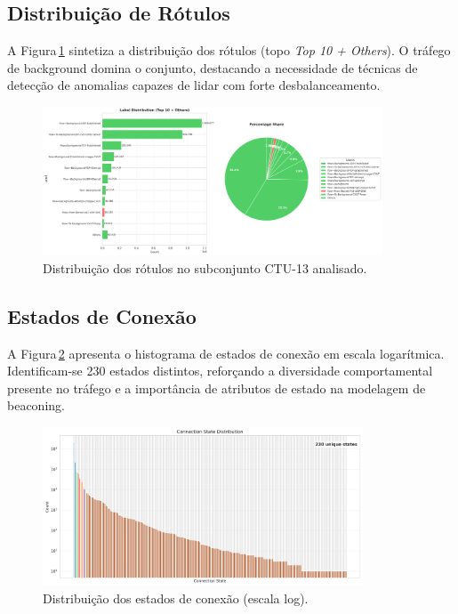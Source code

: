 \documentclass[a4paper, 12pt]{article}
\begin{document}
\subsection{Distribuição de Rótulos}
A Figura\,\ref{fig:label_distribution} sintetiza a distribuição dos rótulos (topo \emph{Top 10 + Others}). O tráfego de background domina o conjunto, destacando a necessidade de técnicas de detecção de anomalias capazes de lidar com forte desbalanceamento.

\begin{figure}[H]
    \centering
    \includegraphics[width=0.9\textwidth]{label_distribution.png}
    \caption{Distribuição dos rótulos no subconjunto CTU-13 analisado.}
    \label{fig:label_distribution}
\end{figure}

\subsection{Estados de Conexão}
A Figura\,\ref{fig:connection_state} apresenta o histograma de estados de conexão em escala logarítmica. Identificam-se 230 estados distintos, reforçando a diversidade comportamental presente no tráfego e a importância de atributos de estado na modelagem de beaconing.

\begin{figure}[H]
    \centering
    \includegraphics[width=0.85\textwidth]{connection_state_distribution.png}
    \caption{Distribuição dos estados de conexão (escala log).}
    \label{fig:connection_state}
\end{figure}
\end{document}

